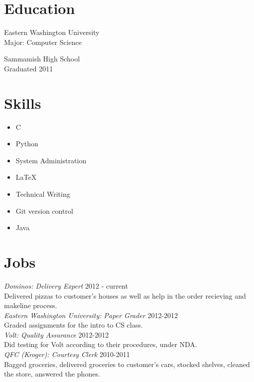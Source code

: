 \documentclass[line, margin, 12pt]{res}
\begin{document}
\address{12924 SE 26th ST \\ Bellevue WA, 98005 \\ +1 (425) 221-7761}
     
\begin{resume}
\section{Education}
Eastern Washington University \\
Major: Computer Science

Sammamish High School \\
Graduated 2011
     
\section{Skills}
\begin{itemize}
\item C
\item Python
\item System Administration
\item \LaTeX
\item Technical Writing
\item Git version control
\item Java
\end{itemize}
     
\section{Jobs}
\textit{Dominos: Delivery Expert} \hfill 2012 - current \\
Delivered pizzas to customer's houses as well as help in the order
recieving and makeline process. \\ [10pt]
\textit{Eastern Washington University: Paper Grader} \hfill 2012-2012 \\
Graded assignments for the intro to CS class. \\ [10pt]
\textit{Volt: Quality Assurance} \hfill 2012-2012 \\
Did testing for Volt according to their procedures, under NDA. \\ [10pt]
\textit{QFC (Kroger): Courtesy Clerk} \hfill 2010-2011 \\
Bagged groceries, delivered groceries to customer's cars, stocked
shelves, cleaned the store, answered the phones. \\ [10pt]


\end{resume}
\end{document}
